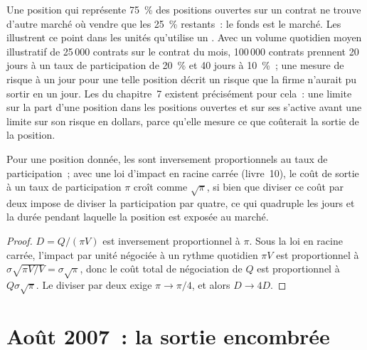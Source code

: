 Une position qui représente 75~\% des positions ouvertes sur un contrat ne trouve d'autre marché où vendre que les 25~\% restants~: le fonds est le marché. Les  illustrent ce point dans les unités qu'utilise un . Avec un volume quotidien moyen illustratif de 25\,000 contrats sur le contrat du mois, 100\,000
contrats prennent 20 jours à un taux de participation de 20~\% et 40 jours à 10~\%~; une mesure de risque à un jour pour une telle position décrit un risque que la firme n'aurait pu
sortir en un jour. Les  du chapitre~7 existent précisément pour cela~: une limite sur la part d'une position dans les positions ouvertes et sur ses 
s'active avant une limite sur son risque en dollars, parce qu'elle mesure ce que coûterait la sortie de la position.

\begin{proposition}\label{prop:fm:case-studies-i:days}
Pour une position donnée, les  sont inversement proportionnels au taux de participation~; avec une loi d'impact en racine carrée (livre~10), le coût de
sortie à un taux de participation $\pi$ croît comme $\sqrt\pi$, si bien que diviser ce coût par deux impose de diviser la participation par quatre, ce qui quadruple les jours
et la durée pendant laquelle la position est exposée au marché.
\end{proposition}

\begin{proof}
$D=Q/(\pi V)$ est inversement proportionnel à $\pi$. Sous la loi en racine carrée, l'impact par unité négociée à un rythme quotidien $\pi V$ est proportionnel à
$\sigma\sqrt{\pi V/V}=\sigma\sqrt\pi$, donc le coût total de négociation de $Q$ est proportionnel à $Q\sigma\sqrt\pi$. Le diviser par deux exige $\pi\to\pi/4$, et
alors $D\to4D$.
\end{proof}

\section{Août 2007~: la sortie encombrée}

